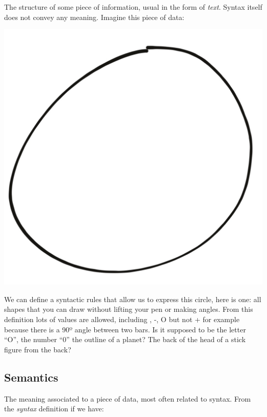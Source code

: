 \documentclass[
]{article}
\begin{document}
The structure of some piece of information, usual in the form of
\emph{text}. Syntax itself does not convey any meaning. Imagine this
piece of data:

\includegraphics{Zero.jpg}

We can define a syntactic rules that allow us to express this circle,
here is one: all shapes that you can draw without lifting your pen or
making angles. From this definition lots of values are allowed,
including \textbar, -, O but not + for example because there is a 90º
angle between two bars. Is it supposed to be the letter ``O'', the
number ``0'' the outline of a planet? The back of the head of a stick
figure from the back?

\hypertarget{semantics-1}{%
\subsection{Semantics}\label{semantics-1}}

The meaning associated to a piece of data, most often related to syntax.
From the \emph{syntax} definition if we have:
\end{document}
